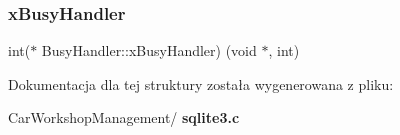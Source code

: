 \mbox{\label{struct_busy_handler_a50de3503bf2bbd10d9cd817faaeda9c5}} 
\subsubsection{xBusyHandler}
{\footnotesize\ttfamily int($\ast$ Busy\+Handler\+::x\+Busy\+Handler) (void $\ast$, int)}



Dokumentacja dla tej struktury została wygenerowana z pliku\+:\begin{DoxyCompactItemize}
\item 
Car\+Workshop\+Management/\textbf{ sqlite3.\+c}\end{DoxyCompactItemize}
